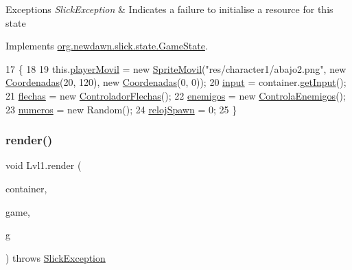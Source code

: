 \begin{DoxyExceptions}{Exceptions}
{\em Slick\+Exception} & Indicates a failure to initialise a resource for this state \\
\hline
\end{DoxyExceptions}


Implements \mbox{\hyperlink{interfaceorg_1_1newdawn_1_1slick_1_1state_1_1_game_state_aa799a369e0fcfe6822d2d586fa6f5bbc}{org.\+newdawn.\+slick.\+state.\+Game\+State}}.


\begin{DoxyCode}
17                                                                                         \{
18         
19         this.\mbox{\hyperlink{class_lvl1_a7ac9bfa1d79eb27089228a152072efd2}{playerMovil}} = \textcolor{keyword}{new} \mbox{\hyperlink{class_sprite_movil}{SpriteMovil}}(\textcolor{stringliteral}{"res/character1/abajo2.png"}, \textcolor{keyword}{new} 
      \mbox{\hyperlink{class_coordenadas}{Coordenadas}}(20, 120), \textcolor{keyword}{new} \mbox{\hyperlink{class_coordenadas}{Coordenadas}}(0, 0));
20         \mbox{\hyperlink{class_lvl1_abd0692137420767ebe0bb0b3d5b2cfd8}{input}} = container.\mbox{\hyperlink{classorg_1_1newdawn_1_1slick_1_1_game_container_a6042fd06c54872f9f791bd33beffec88}{getInput}}();
21         \mbox{\hyperlink{class_lvl1_a252ada5a964b9a5b559aaa0773cb5643}{flechas}} = \textcolor{keyword}{new} \mbox{\hyperlink{class_controlador_flechas}{ControladorFlechas}}();
22         \mbox{\hyperlink{class_lvl1_af3ba4e431a1c46ce7ee27eaf566c5978}{enemigos}} = \textcolor{keyword}{new} \mbox{\hyperlink{class_controla_enemigos}{ControlaEnemigos}}();
23         \mbox{\hyperlink{class_lvl1_ad5839902bce539ea6f65fd915b1c5e8a}{numeros}} = \textcolor{keyword}{new} Random();
24         \mbox{\hyperlink{class_lvl1_a414b04482f33deead358ca7f1b5c6de0}{relojSpawn}} = 0;
25     \}
\end{DoxyCode}
\mbox{\label{class_lvl1_abd2b3619698781c674910dc755908858}} 
\subsubsection{\texorpdfstring{render()}{render()}}
{\footnotesize\ttfamily void Lvl1.\+render (\begin{DoxyParamCaption}\item[{\mbox{\hyperlink{classorg_1_1newdawn_1_1slick_1_1_game_container}{Game\+Container}}}]{container,  }\item[{\mbox{\hyperlink{classorg_1_1newdawn_1_1slick_1_1state_1_1_state_based_game}{State\+Based\+Game}}}]{game,  }\item[{\mbox{\hyperlink{classorg_1_1newdawn_1_1slick_1_1_graphics}{Graphics}}}]{g }\end{DoxyParamCaption}) throws \mbox{\hyperlink{classorg_1_1newdawn_1_1slick_1_1_slick_exception}{Slick\+Exception}}\hspace{0.3cm}{\ttfamily [inline]}}

